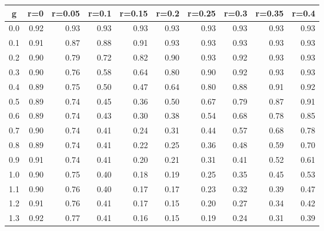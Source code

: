%
\begin{table}[!tbp]
 \begin{center}
 \begin{tabular}{rrrrrrrrrr}\hline\hline
\multicolumn{1}{c}{g}&\multicolumn{1}{c}{r=0}&\multicolumn{1}{c}{r=0.05}&\multicolumn{1}{c}{r=0.1}&\multicolumn{1}{c}{r=0.15}&\multicolumn{1}{c}{r=0.2}&\multicolumn{1}{c}{r=0.25}&\multicolumn{1}{c}{r=0.3}&\multicolumn{1}{c}{r=0.35}&\multicolumn{1}{c}{r=0.4}\tabularnewline
\hline
0.0&0.92&0.93&0.93&0.93&0.93&0.93&0.93&0.93&0.93\tabularnewline
0.1&0.91&0.87&0.88&0.91&0.93&0.93&0.93&0.93&0.93\tabularnewline
0.2&0.90&0.79&0.72&0.82&0.90&0.93&0.92&0.93&0.93\tabularnewline
0.3&0.90&0.76&0.58&0.64&0.80&0.90&0.92&0.93&0.93\tabularnewline
0.4&0.89&0.75&0.50&0.47&0.64&0.80&0.88&0.91&0.92\tabularnewline
0.5&0.89&0.74&0.45&0.36&0.50&0.67&0.79&0.87&0.91\tabularnewline
0.6&0.89&0.74&0.43&0.30&0.38&0.54&0.68&0.78&0.85\tabularnewline
0.7&0.90&0.74&0.41&0.24&0.31&0.44&0.57&0.68&0.78\tabularnewline
0.8&0.89&0.74&0.41&0.22&0.25&0.36&0.48&0.59&0.70\tabularnewline
0.9&0.91&0.74&0.41&0.20&0.21&0.31&0.41&0.52&0.61\tabularnewline
1.0&0.90&0.75&0.40&0.18&0.19&0.25&0.35&0.45&0.53\tabularnewline
1.1&0.90&0.76&0.40&0.17&0.17&0.23&0.32&0.39&0.47\tabularnewline
1.2&0.91&0.76&0.41&0.17&0.15&0.20&0.27&0.34&0.42\tabularnewline
1.3&0.92&0.77&0.41&0.16&0.15&0.19&0.24&0.31&0.39\tabularnewline
\hline
\end{tabular}

\end{center}

\end{table}

